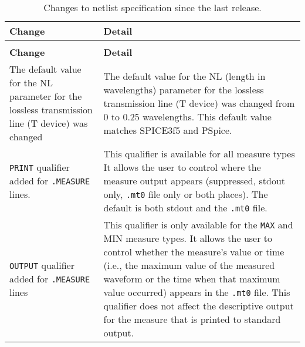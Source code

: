 



{
\small

\begin{longtable}[h] {>{\raggedright\small}m{2in}|>{\raggedright\let\\\tabularnewline\small}m{3.5in}}
  \caption{Changes to netlist specification since the last release.\label{newUsage}} \\ \hline
  \rowcolor{XyceDarkBlue}
  \color{white}\bf Change &
  \color{white}\bf Detail \\ \hline \endfirsthead
  \caption[]{Changes to netlist specification since the last release.\label{newUsage}} \\ \hline
  \rowcolor{XyceDarkBlue}
  \color{white}\bf Change &
  \color{white}\bf Detail \\ \hline \endhead


The default value for the NL parameter for the lossless transmission line
(T device) was changed & The default value for the NL (length in wavelengths) 
parameter for the lossless transmission line (T device) was changed from 
0 to 0.25 wavelengths. This default value matches SPICE3f5 and PSpice.
\\ \hline

\texttt{PRINT} qualifier added for \texttt{.MEASURE} lines.  & This qualifier
is available for all measure types  It allows the user to control where 
the measure output appears (suppressed, stdout only, \texttt{.mt0} file 
only or both places).  The default is both stdout and the \texttt{.mt0} file.
\\ \hline

\texttt{OUTPUT} qualifier added for \texttt{.MEASURE} lines  & This qualifier
is only available for the \texttt{MAX} and {MIN} measure types.  It allows the
user to control whether the measure's value or time (i.e., the maximum value
of the measured waveform or the time when that maximum value occurred) appears
in the \texttt{.mt0} file.  This qualifier does not affect the
descriptive output for the measure that is printed to standard output.

\end{longtable}
}
